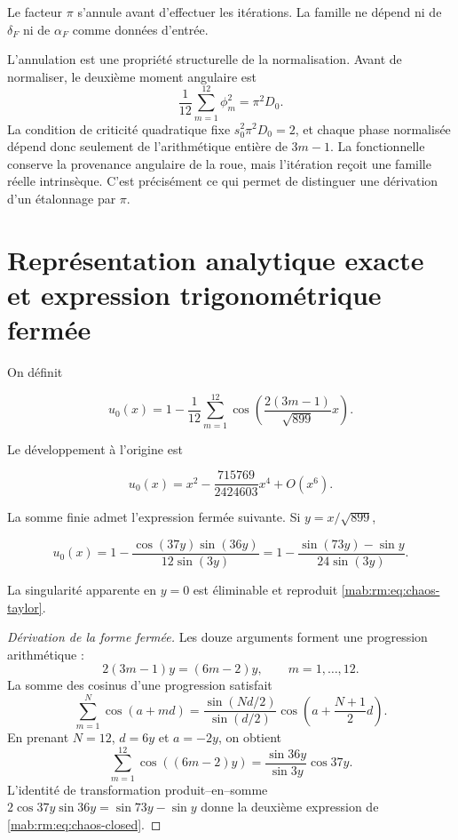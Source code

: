 Le facteur \(\pi\) s’annule avant d’effectuer les itérations. La famille ne
dépend ni de \(\delta_F\) ni de \(\alpha_F\) comme données d’entrée.

L’annulation est une propriété structurelle de la normalisation. Avant de
normaliser,
le deuxième moment angulaire est
\[
\frac1{12}\sum_{m=1}^{12}\phi_m^2
=\pi^2D_0.
\]
La condition de criticité quadratique fixe
\(s_0^2\pi^2D_0=2\), et chaque phase normalisée dépend donc seulement de
l’arithmétique entière de \(3m-1\). La fonctionnelle conserve la provenance angulaire de
la roue, mais l’itération reçoit une famille réelle intrinsèque. C’est
précisément ce qui permet de distinguer une dérivation d’un étalonnage
par \(\pi\).

\section{Représentation analytique exacte et expression trigonométrique fermée}

On définit

\begin{equation}
u_0(x)=1-\frac1{12}\sum_{m=1}^{12}
\cos\!\left(\frac{2(3m-1)}{\sqrt{899}}x\right).
\label{mab:rm:eq:chaos-profile}
\end{equation}

Le développement à l’origine est

\begin{equation}
u_0(x)=x^2-\frac{715769}{2424603}x^4+O(x^6).
\label{mab:rm:eq:chaos-taylor}
\end{equation}

La somme finie admet l’expression fermée suivante. Si \(y=x/\sqrt{899}\),

\begin{equation}
u_0(x)=1-\frac{\cos(37y)\sin(36y)}{12\sin(3y)}
=1-\frac{\sin(73y)-\sin y}{24\sin(3y)}.
\label{mab:rm:eq:chaos-closed}
\end{equation}

La singularité apparente en \(y=0\) est éliminable et reproduit \cref{mab:rm:eq:chaos-taylor}.

\begin{proof}[Dérivation de la forme fermée]
Les douze arguments forment une progression arithmétique :
\[
2(3m-1)y=(6m-2)y,\qquad m=1,\ldots,12.
\]
La somme des cosinus d’une progression satisfait
\[
\sum_{m=1}^{N}\cos(a+md)
=\frac{\sin(Nd/2)}{\sin(d/2)}
 \cos\!\left(a+\frac{N+1}{2}d\right).
\]
En prenant \(N=12\), \(d=6y\) et \(a=-2y\), on obtient
\[
\sum_{m=1}^{12}\cos((6m-2)y)
=\frac{\sin36y}{\sin3y}\cos37y.
\]
L’identité de transformation produit--en--somme
\(2\cos37y\sin36y=\sin73y-\sin y\) donne la deuxième expression de
\cref{mab:rm:eq:chaos-closed}.
\end{proof}

